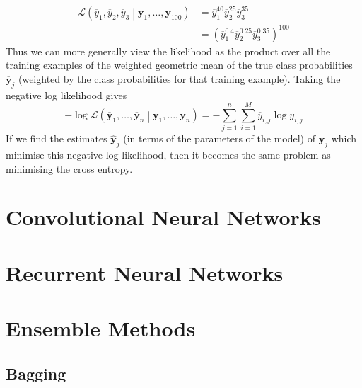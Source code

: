 \documentclass[11pt]{report} %
\begin{document}
\begin{align}
\mathcal{L}\left(\overline{y}_{1}, \overline{y}_{2}, \overline{y}_{3}\middle|\mathbf{y}_{1}, \dots, \mathbf{y}_{100}\right) &= \overline{y}_{1}^{40}\overline{y}_{2}^{25}\overline{y}_{3}^{35} \\
&= \left(\overline{y}_{1}^{0.4}\overline{y}_{2}^{0.25}\overline{y}_{3}^{0.35}\right)^{100}
\end{align}
Thus we can more generally view the likelihood as the product over all the training examples of the weighted geometric mean of the true class probabilities $\overline{\mathbf{y}}_{j}$ (weighted by the class probabilities for that training example). Taking the negative log likelihood gives
\begin{equation}
-\log\mathcal{L}\left(\overline{\mathbf{y}}_{1}, \dots, \overline{\mathbf{y}}_{n}\middle|\mathbf{y}_{1}, \dots, \mathbf{y}_{n}\right) = -\sum_{j = 1}^{n}\sum_{i = 1}^{M}\overline{y}_{i, j}\log{y_{i, j}}
\end{equation}
If we find the estimates $\hat{\mathbf{y}}_{j}$ (in terms of the parameters of the model) of $\overline{\mathbf{y}}_{j}$ which minimise this negative log likelihood, then it becomes the same problem as minimising the cross entropy.

\section{Convolutional Neural Networks}

\section{Recurrent Neural Networks}

\section{Ensemble Methods}

\subsection{Bagging}
\end{document}
